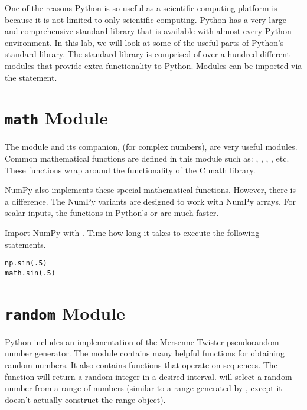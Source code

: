 
One of the reasons Python is so useful as a scientific computing platform is because it is not limited to only scientific computing.
Python has a very large and comprehensive standard library that is available with almost every Python environment.
In this lab, we will look at some of the useful parts of Python's standard library.
The standard library is comprised of over a hundred different modules that provide extra functionality to Python.
Modules can be imported via the  statement.

\section*{\texttt{math} Module}
The  module and its companion,  (for complex numbers), are very useful modules.
Common mathematical functions are defined in this module such as: , , , , etc.  These functions wrap around the functionality of the C math library.

\begin{problem}
NumPy also implements these special mathematical functions.
However, there is a difference.
The NumPy variants are designed to work with NumPy arrays.
For scalar inputs, the functions in Python's  or  are much faster.

Import NumPy with .
Time how long it takes to execute the following statements.
\begin{lstlisting}
np.sin(.5)
math.sin(.5)
\end{lstlisting}
\end{problem}

\section*{\texttt{random} Module}
Python includes an implementation of the Mersenne Twister pseudorandom number generator.
The  module contains many helpful functions for obtaining random numbers.
It also contains functions that operate on sequences.
The  function will return a random integer in a desired interval.  
 will select a random number from a range of numbers (similar to a range generated by , except it doesn't actually construct the range object).

